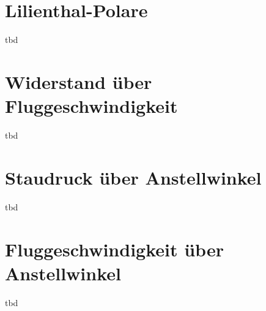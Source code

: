 \section{Lilienthal-Polare}
tbd

\section{Widerstand über Fluggeschwindigkeit}
tbd

\section{Staudruck über Anstellwinkel}
tbd

\section{Fluggeschwindigkeit über Anstellwinkel}
tbd